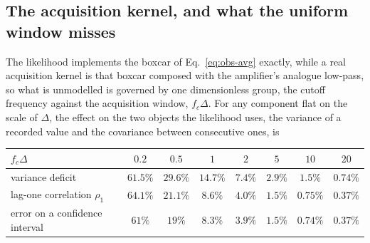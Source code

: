 \begin{appendixbox}
\subsection*{The acquisition kernel, and what the uniform window misses}

The likelihood implements the boxcar of Eq.~\ref{eq:obs-avg} exactly, while a real acquisition
kernel is that boxcar composed with the amplifier's analogue low-pass, so what is unmodelled is
governed by one dimensionless group, the cutoff frequency against the acquisition window,
$f_c\Delta$. For any component flat on the scale of $\Delta$, the effect on the two objects the
likelihood uses, the variance of a recorded value and the covariance between consecutive ones, is

\begin{center}
\begin{tabular}{@{}lccccccc@{}}
\toprule
$f_c\Delta$ & $0.2$ & $0.5$ & $1$ & $2$ & $5$ & $10$ & $20$ \\
\midrule
variance deficit & $61.5\%$ & $29.6\%$ & $14.7\%$ & $7.4\%$ & $2.9\%$ & $1.5\%$ & $0.74\%$ \\
lag-one correlation $\rho_1$ & $64.1\%$ & $21.1\%$ & $8.6\%$ & $4.0\%$ & $1.5\%$ & $0.75\%$ & $0.37\%$ \\
error on a confidence interval & $61\%$ & $19\%$ & $8.3\%$ & $3.9\%$ & $1.5\%$ & $0.74\%$ & $0.37\%$ \\
\bottomrule
\end{tabular}
\end{center}


\end{appendixbox}

